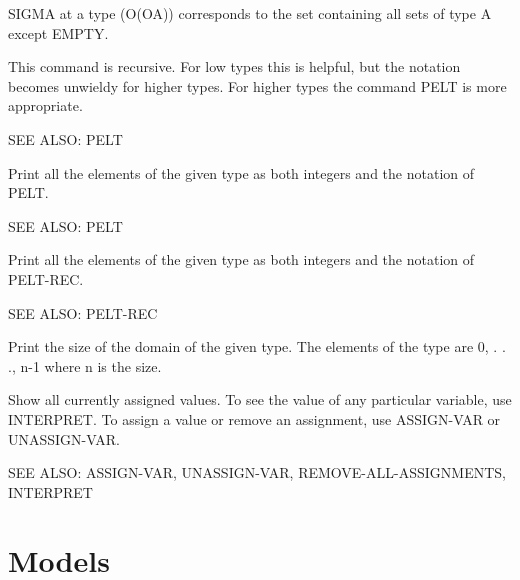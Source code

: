 \begin{description}
SIGMA at a type (O(OA)) corresponds to the set containing all sets of
type A except EMPTY.

This command is recursive.  For low types this is helpful, but
the notation becomes unwieldy for higher types.  For higher types
the command PELT is more appropriate.

SEE ALSO: PELT

\item[PELTS]  
Print all the elements of the given type as both integers
and the notation of PELT.

SEE ALSO: PELT

\item[PELTS-REC]  
Print all the elements of the given type as both integers
and the notation of PELT-REC.

SEE ALSO: PELT-REC

\item[PSIZE]  
Print the size of the domain of the given type.
The elements of the type are 0, . . ., n-1 where n is the size.

\item[SHOW-ASSIGNMENTS]  
Show all currently assigned values.  To see the value of any
particular variable, use INTERPRET.  To assign a value or remove an
assignment, use ASSIGN-VAR or UNASSIGN-VAR.

SEE ALSO: ASSIGN-VAR, UNASSIGN-VAR, REMOVE-ALL-ASSIGNMENTS, INTERPRET
\item
\end{description}

\section{Models}

